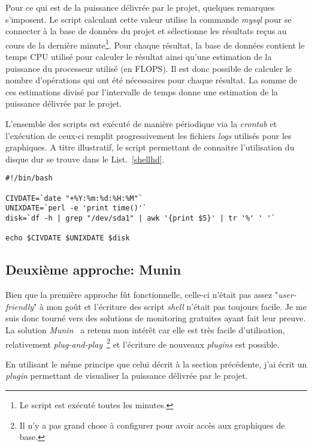 \documentclass[a4paper, 11pt]{report}
\begin{document}
Pour ce qui est de la puissance délivrée par le projet, quelques remarques s'imposent. Le script calculant cette valeur utilise la commande \textit{mysql} pour se connecter à la base de données du projet et sélectionne les résultats reçus au cours de la dernière minute\footnote{Le script est exécuté toutes les minutes.}. Pour chaque résultat, la base de données contient le temps CPU utilisé pour calculer le résultat ainsi qu'une estimation de la puissance du processeur utilisé (en FLOPS). Il est donc possible de calculer le nombre d'opérations qui ont été nécessaires pour chaque résultat. La somme de ces estimations divisé par l'intervalle de temps donne une estimation de la puissance délivrée par le projet.

L'ensemble des scripts est exécuté de manière périodique via la \textit{crontab} et l'exécution de ceux-ci remplit progressivement les fichiers \textit{logs} utilisés pour les graphiques. A titre illustratif, le script permettant de connaitre l'utilisation du disque dur se trouve dans le List.~\ref{shellhd}. %


\begin{lstlisting}
#!/bin/bash

CIVDATE=`date "+%Y:%m:%d:%H:%M"`
UNIXDATE=`perl -e 'print time()'`
disk=`df -h | grep "/dev/sda1" | awk '{print $5}' | tr '%' ' '`

echo $CIVDATE $UNIXDATE $disk
\end{lstlisting}


\subsection{Deuxième approche: Munin}
Bien que la première approche fût fonctionnelle, celle-ci n'était pas assez "\textit{user-friendly}" à mon goût et l'écriture des script \textit{shell} n'était pas toujours facile. Je me suis donc tourné vers des solutions de monitoring gratuites ayant fait leur preuve. La solution \textit{Munin}~\cite{MUNIN} a retenu mon intérêt car elle est très facile d'utilisation, relativement \textit{plug-and-play}~\footnote{Il n'y a pas grand chose à configurer pour avoir accès aux graphiques de base.} et l'écriture de nouveaux \textit{plugins} est possible.

En utilisant le même principe que celui décrit à la section précédente, j'ai écrit un \textit{plugin} permettant de visualiser la puissance délivrée par le projet.
\end{document}
